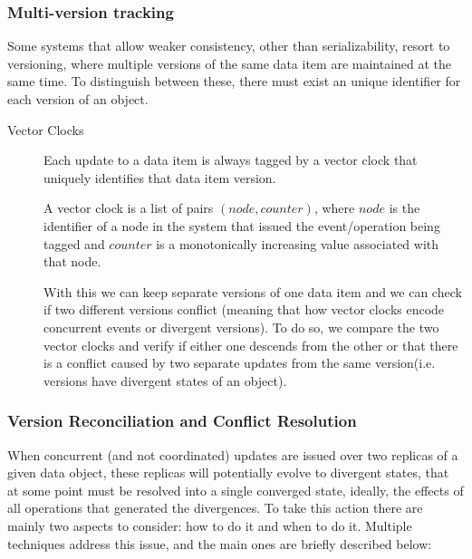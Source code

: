 
\subsubsection{Multi-version tracking}
\label{sec:versioning}
Some systems that allow weaker consistency, other than serializability, resort to versioning, where multiple versions of the same data item are maintained at the same time. To distinguish between these, there must exist an unique identifier for each version of an object.

\begin{description}
\item[Vector Clocks] Each update to a data item is always tagged by a vector clock that uniquely identifies that data item version.\par
	A vector clock is a list of pairs $(node, counter)$, where $node$ is the identifier of a node in the system that issued the event/operation being tagged and $counter$ is a monotonically increasing value associated with that node.\par
	With this we can keep separate versions of one data item and we can check if two different versions conflict (meaning that how vector clocks encode concurrent events or divergent versions). To do so, we compare the two vector clocks and verify if either one descends from the other or that there is a conflict caused by two separate updates from the same version(i.e. versions have divergent states of an object).
\end{description}

\subsubsection{Version Reconciliation and Conflict Resolution}
\label{sec:conflict_resolution}

When concurrent (and not coordinated) updates are issued over two replicas of a given data object, these replicas will potentially evolve to divergent states, that at some point must be resolved into a single converged state, ideally, the effects of all operations that generated the divergences. To take this action there are mainly two aspects to consider: how to do it and when to do it. Multiple techniques address this issue, and the main ones are briefly described below:

